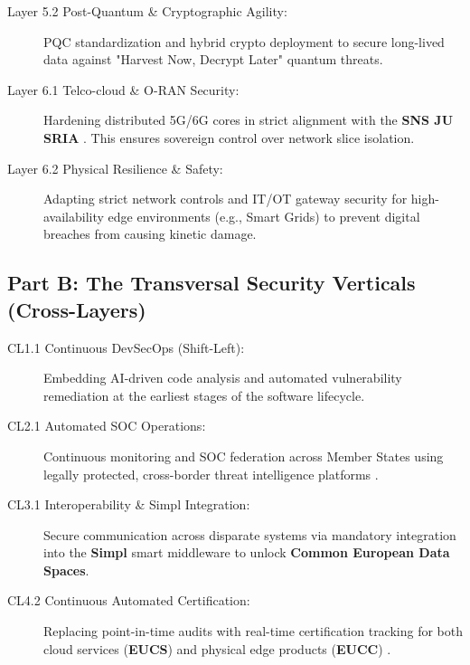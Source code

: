 \documentclass[12pt,a4paper]{article}
\begin{document}
\begin{description}
\item[Layer 5.2 Post-Quantum \& Cryptographic Agility:] PQC standardization and hybrid crypto deployment to secure long-lived data against "Harvest Now, Decrypt Later" quantum threats.

\item[Layer 6.1 Telco-cloud \& O-RAN Security:] Hardening distributed 5G/6G cores in strict alignment with the \textbf{SNS JU SRIA} \cite{snsju}. This ensures sovereign control over network slice isolation.

\item[Layer 6.2 Physical Resilience \& Safety:] Adapting strict network controls and IT/OT gateway security for high-availability edge environments (e.g., Smart Grids) to prevent digital breaches from causing kinetic damage.
\end{description}

\subsection*{Part B: The Transversal Security Verticals (Cross-Layers)}
\begin{description}
\item[CL1.1 Continuous DevSecOps (Shift-Left):] Embedding AI-driven code analysis and automated vulnerability remediation at the earliest stages of the software lifecycle.

\item[CL2.1 Automated SOC Operations:] Continuous monitoring and SOC federation across Member States using legally protected, cross-border threat intelligence platforms \cite{concordia}.

\item[CL3.1 Interoperability \& Simpl Integration:] Secure communication across disparate systems via mandatory integration into the \textbf{Simpl} smart middleware \cite{cloud_edge_roadmap} to unlock \textbf{Common European Data Spaces}.

\item[CL4.2 Continuous Automated Certification:] Replacing point-in-time audits with real-time certification tracking for both cloud services (\textbf{EUCS}) and physical edge products (\textbf{EUCC}) \cite{eucc}.
\end{description}
\end{document}
